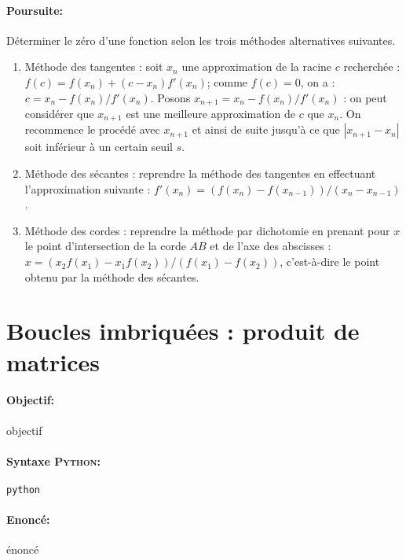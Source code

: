 \documentclass[11pt,a4paper,colorlinks,breaklinks]{article}
\def\python{\textsc{Python}}
\begin{document}
\paragraph{Poursuite:} Déterminer le zéro d'une fonction 
selon les trois méthodes alternatives suivantes.
\begin{enumerate}
\item Méthode des tangentes : 
	soit $x_n$ une approximation de la racine $c$ recherchée : 
	$f(c) = f(x_n) + (c-x_n)f'(x_n)$; comme $f(c) = 0$, on a : 
	$c = x_n - f(x_n)/f'(x_n)$. Posons $x_{n+1} = x_n - f(x_n)/f'(x_n)$ : 
	on peut considérer que $x_{n+1}$ est une meilleure approximation de $c$ que 
	$x_n$. On recommence le procédé avec $x_{n+1}$  et ainsi de suite jusqu'à ce 
	que $|x_{n+1}-x_n|$ soit inférieur à un certain seuil $s$.
	
\item Méthode des sécantes : 
	reprendre la méthode des tangentes en effectuant 
	l'approximation suivante : $f'(x_n) = (f(x_n)-f(x_{n-1}))/(x_n-x_{n-1})$.
	
\item Méthode des cordes : reprendre la méthode par dichotomie en prenant pour $x$ 
	le point d'intersection de la corde $AB$ et de l'axe des abscisses : 
	$x = (x_2f(x_1) - x_1f(x_2))/(f(x_1)-f(x_2))$, c'est-à-dire le point obtenu 
	par la méthode des sécantes.
\end{enumerate}

\newpage
\section{Boucles imbriquées : produit de matrices}\label{maths:boucles-imbriquees}
\paragraph{Objectif:} objectif

\paragraph{Syntaxe \python:} \texttt{python}

\begin{framed}
\paragraph{Enoncé:} énoncé
\end{framed}
\end{document}
